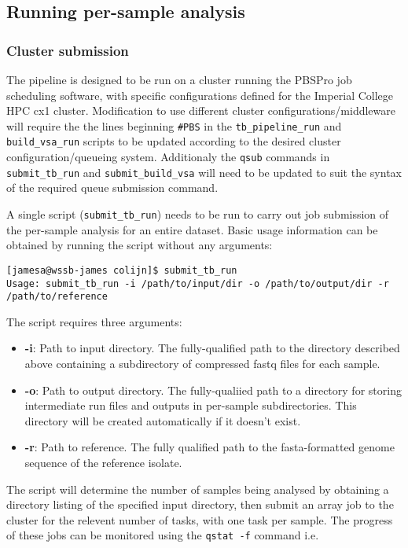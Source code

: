 \documentclass[a4paper,10pt,twoside]{article}
\begin{document}
\subsection {Running per-sample analysis}

\subsubsection {Cluster submission}

The pipeline is designed to be run on a cluster running the PBSPro job
scheduling software, with specific configurations defined for the Imperial
College HPC cx1 cluster. Modification to use different cluster
configurations/middleware will require the the lines beginning {\tt \#PBS} in
the {\tt tb\_pipeline\_run} and {\tt build\_vsa\_run} scripts to be updated
according to the desired cluster configuration/queueing system. Additionaly the
{\tt qsub} commands in {\tt submit\_tb\_run} and {\tt submit\_build\_vsa} will need
to be updated to suit the syntax of the required queue submission command. 

A single script ({\tt submit\_tb\_run}) needs to be run to carry out job
submission of the per-sample analysis for an entire dataset. Basic usage
information can be obtained by running the script without any arguments:

\begin{verbatim}
[jamesa@wssb-james colijn]$ submit_tb_run 
Usage: submit_tb_run -i /path/to/input/dir -o /path/to/output/dir -r /path/to/reference
\end{verbatim}

The script requires three arguments:

\begin{itemize}
\item \textbf{-i}: Path to input directory. The fully-qualified path to
the directory described above containing a subdirectory of compressed fastq
files for each sample.
 \item \textbf{-o}: Path to output directory. The fully-qualiied path to a
directory for storing intermediate run files and outputs in per-sample
subdirectories. This directory will be created automatically if it doesn't
exist. 
\item \textbf{-r}: Path to reference. The fully qualified path to the
fasta-formatted genome sequence of the reference isolate.
\end{itemize}

The script will determine the number of samples being analysed by obtaining a
directory listing of the specified input directory, then submit an array job to
the cluster for the relevent number of tasks, with one task per sample. The
progress of these jobs can be monitored using the {\tt qstat -f} command i.e. 
\end{document}
